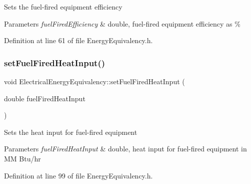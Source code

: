 Sets the fuel-\/fired equipment efficiency


\begin{DoxyParams}{Parameters}
{\em fuel\+Fired\+Efficiency} & double, fuel-\/fired equipment efficiency as \% \\
\hline
\end{DoxyParams}


Definition at line 61 of file Energy\+Equivalency.\+h.

\mbox{\label{class_electrical_energy_equivalency_a9daf2b93c52c31cb999e5a9a18f1dd54}} 
\subsubsection{\texorpdfstring{set\+Fuel\+Fired\+Heat\+Input()}{setFuelFiredHeatInput()}\hspace{0.1cm}{\footnotesize\ttfamily [1/3]}}
{\footnotesize\ttfamily void Electrical\+Energy\+Equivalency\+::set\+Fuel\+Fired\+Heat\+Input (\begin{DoxyParamCaption}\item[{double}]{fuel\+Fired\+Heat\+Input }\end{DoxyParamCaption})\hspace{0.3cm}{\ttfamily [inline]}}

Sets the heat input for fuel-\/fired equipment


\begin{DoxyParams}{Parameters}
{\em fuel\+Fired\+Heat\+Input} & double, heat input for fuel-\/fired equipment in MM Btu/hr \\
\hline
\end{DoxyParams}


Definition at line 99 of file Energy\+Equivalency.\+h.

\mbox{\label{class_electrical_energy_equivalency_a9daf2b93c52c31cb999e5a9a18f1dd54}} 
